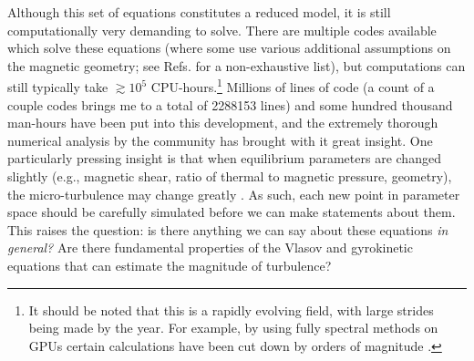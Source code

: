 Although this set of equations constitutes a reduced model, it is still computationally very demanding to solve. There are multiple codes available which solve these equations (where some use various additional assumptions on the magnetic geometry; see Refs. \cite{jenko2000electron,barnes_michael_2022_6882296,maurer2020gene,barnes2019stella,francisquez2020gkeyll} for a non-exhaustive list), but computations can still typically take $\gtrsim 10^5$ CPU-hours.\footnote{It should be noted that this is a rapidly evolving field, with large strides being made by the year. For example, by using fully spectral methods on GPUs certain calculations have been cut down by orders of magnitude \cite{mandell_dorland_landreman_2018,mandell2022gx}.} Millions of lines of code (a count of a couple codes brings me to a total of 2288153 lines) and some hundred thousand man-hours have been put into this development, and the extremely thorough numerical analysis by the community has brought with it great insight. One particularly pressing insight is that when equilibrium parameters are changed slightly (e.g., magnetic shear, ratio of thermal to magnetic pressure, geometry), the micro-turbulence may change greatly \cite{dimits2000comparisons,kinsey2006effect,alcuson2020suppression,volvcokas2022ultra,mulholland2023enhanced}. As such, each new point in parameter space should be carefully simulated before we can make statements about them. This raises the question: is there anything we can say about these equations {\it in general?} Are there fundamental properties of the Vlasov and gyrokinetic equations that can estimate the magnitude of turbulence?

